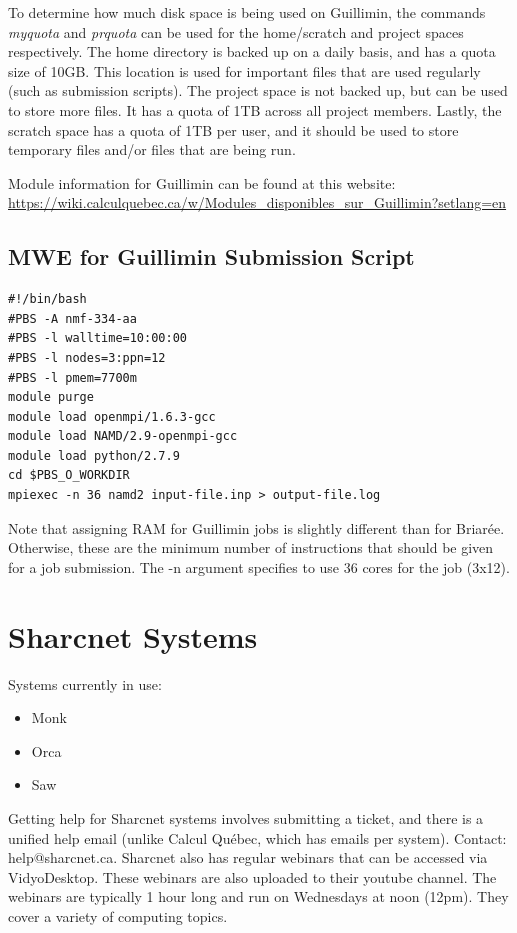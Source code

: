 \documentclass[12pt]{article}
\begin{document}
\quad To determine how much disk space is being used on Guillimin, the commands \textit{myquota} and \textit{prquota} can be used for the home/scratch and project spaces respectively. The home directory is backed up on a daily basis, and has a quota size of 10GB. This location is used for important files that are used regularly (such as submission scripts). The project space is not backed up, but can be used to store more files. It has a quota of 1TB across all project members. Lastly, the scratch space has a quota of 1TB per user, and it should be used to store temporary files and/or files that are being run.

\quad Module information for Guillimin can be found at this website: \url{https://wiki.calculquebec.ca/w/Modules_disponibles_sur_Guillimin?setlang=en}

\subsection{MWE for Guillimin Submission Script}

\begin{lstlisting}
#!/bin/bash
#PBS -A nmf-334-aa
#PBS -l walltime=10:00:00
#PBS -l nodes=3:ppn=12
#PBS -l pmem=7700m
module purge
module load openmpi/1.6.3-gcc
module load NAMD/2.9-openmpi-gcc
module load python/2.7.9
cd $PBS_O_WORKDIR
mpiexec -n 36 namd2 input-file.inp > output-file.log
\end{lstlisting}

\quad Note that assigning RAM for Guillimin jobs is slightly different than for Briar\'{e}e. Otherwise, these are the minimum number of instructions that should be given for a job submission. The -n argument specifies to use 36 cores for the job (3x12).

\section{Sharcnet Systems}\label{Sharc}

\quad Systems currently in use:
\begin{itemize}
\item Monk
\item Orca
\item Saw
\end{itemize}

\quad Getting help for Sharcnet systems involves submitting a ticket, and there is a unified help email (unlike Calcul Qu\'{e}bec, which has emails per system). Contact: help@sharcnet.ca. Sharcnet also has regular webinars that can be accessed via VidyoDesktop. These webinars are also uploaded to their youtube channel. The webinars are typically 1 hour long and run on Wednesdays at noon (12pm). They cover a variety of computing topics.
\end{document}
